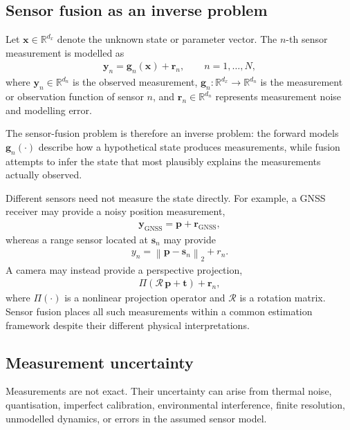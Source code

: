 \documentclass[11pt,oneside,openany]{book}
\begin{document}
\subsection{Sensor fusion as an inverse problem}
Let $\mathbf{x}\in\mathbb{R}^{d_x}$ denote the unknown state or parameter vector. The $n$-th sensor measurement is modelled as
\begin{align}
\mathbf{y}_n=\mathbf{g}_n(\mathbf{x})+\mathbf{r}_n, \qquad n=1,\ldots,N,
\end{align}
where $\mathbf{y}_n\in\mathbb{R}^{d_n}$ is the observed measurement, $\mathbf{g}_n:\mathbb{R}^{d_x}\rightarrow\mathbb{R}^{d_n}$ is the measurement or observation function of sensor $n$, and $\mathbf{r}_n\in\mathbb{R}^{d_n}$ represents measurement noise and modelling error.

The sensor-fusion problem is therefore an inverse problem: the forward models $\mathbf{g}_n(\cdot)$ describe how a hypothetical state produces measurements, while fusion attempts to infer the state that most plausibly explains the measurements actually observed. 

Different sensors need not measure the state directly. For example, a GNSS receiver may provide a noisy position measurement,
\begin{align*}
\mathbf{y}_{\mathrm{GNSS}}=\mathbf{p}+\mathbf{r}_{\mathrm{GNSS}},
\end{align*}
whereas a range sensor located at $\mathbf{s}_n$ may provide
\begin{align*}
y_n=\left\|\mathbf{p}-\mathbf{s}_n\right\|_2+r_n.
\end{align*}
A camera may instead provide a perspective projection,
\begin{align*}
\Pi\left(\boldsymbol{\mathcal{R}}\,\mathbf{p}+\mathbf{t}\right) +\mathbf{r}_n,
\end{align*}
where $\Pi(\cdot)$ is a nonlinear projection operator and $\boldsymbol{\mathcal{R}}$ is a rotation matrix. Sensor fusion places all such measurements within a common estimation framework despite their different physical interpretations.

\subsection{Measurement uncertainty}
Measurements are not exact. Their uncertainty can arise from thermal noise, quantisation, imperfect calibration, environmental interference, finite resolution, unmodelled dynamics, or errors in the assumed sensor model.
\end{document}
